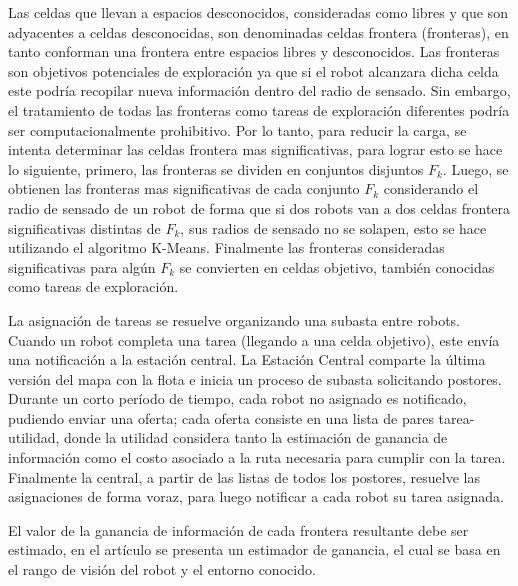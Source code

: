 Las celdas que llevan a espacios desconocidos, consideradas como libres y que son adyacentes a celdas desconocidas, son denominadas celdas frontera (fronteras), en tanto conforman una frontera entre espacios libres y desconocidos. Las fronteras son objetivos potenciales de exploración ya que si el robot alcanzara dicha celda este podría recopilar nueva información dentro del radio de sensado. Sin embargo, el tratamiento de todas las fronteras como tareas de exploración diferentes podría ser computacionalmente prohibitivo. Por lo tanto, para reducir la carga, se intenta determinar las celdas frontera mas significativas, para lograr esto se hace lo siguiente, primero, las fronteras se dividen en conjuntos disjuntos $F_k$. 
Luego, se obtienen las fronteras mas significativas de cada conjunto $F_k$ considerando el radio de sensado de un robot de forma que si dos robots van a dos celdas frontera significativas distintas de $F_k$, sus radios de sensado no se solapen, esto se hace utilizando el algoritmo K-Means. Finalmente las fronteras consideradas significativas para algún $F_k$ se convierten en celdas objetivo, también conocidas como tareas de exploración.

La asignación de tareas se resuelve organizando una subasta entre robots. Cuando un robot completa una tarea (llegando a una celda objetivo), este envía una notificación a la estación central. La Estación Central comparte la última versión del mapa con la flota e inicia un proceso de subasta solicitando postores. Durante un corto período de tiempo, cada robot no asignado es notificado, pudiendo enviar una oferta; cada oferta consiste en una lista de pares tarea-utilidad, donde la utilidad considera tanto la estimación de ganancia de información como el costo asociado a la ruta necesaria para cumplir con la tarea. Finalmente la central, a partir de las listas de todos los postores, resuelve las asignaciones de forma voraz, para luego notificar a cada robot su tarea asignada.

El valor de la ganancia de información de cada frontera resultante debe ser estimado, en el artículo se presenta un estimador de ganancia, el cual se basa en el rango de visión del robot y el entorno conocido. 


